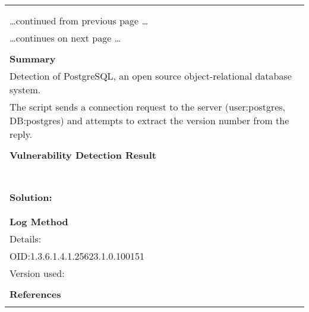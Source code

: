 \documentclass{article}
\begin{document}
\begin{longtable}{|p{}|}
\hline
\rowcolor{gvm_log}{\color{white}{Log (CVSS: 0.0) }}\\
\rowcolor{gvm_log}{\color{white}{NVT: PostgreSQL Detection}}\\
\hline
\endfirsthead
\hfill\ldots continued from previous page \ldots \\
\hline
\endhead
\hline
\ldots continues on next page \ldots \\
\endfoot
\hline
\endlastfoot
\\
\textbf{Summary}\\
Detection of PostgreSQL, an open source object-relational
  database system.\\
  The script sends a connection request to the server (user:postgres, DB:postgres)
  and attempts to extract the version number from the reply.\\

        \hline
        \\
\textbf{Vulnerability Detection Result}\\
\rowcolor{white}{\verb=Detected PostgreSQL=}\\
\rowcolor{white}{\verb=Version:       unknown=}\\
\rowcolor{white}{\verb=Location:      5432/tcp=}\\
\rowcolor{white}{\verb=CPE:           cpe:/a:postgresql:postgresql=}\\
\rowcolor{white}{\verb=Concluded from version/product identification result:=}\\
\rowcolor{white}{\verb=0x00:  52 00 00 00 0C 00 00 00 05 61 F9 DA 4B             R........a..K=}\\

          \hline
          \\
\textbf{Solution:}\\
\\


        \hline
        \\
\textbf{Log Method}\\
Details:
\rowcolor{white}{\verb=PostgreSQL Detection=}\\
OID:1.3.6.1.4.1.25623.1.0.100151\\
Version used:
\rowcolor{white}{\verb=2020-11-12T10:09:08Z=}\\

      \hline
      \\
\textbf{References}\\
\rowcolor{white}{\verb=url: https://www.postgresql.org/=}\\
\end{longtable}
\end{document}
